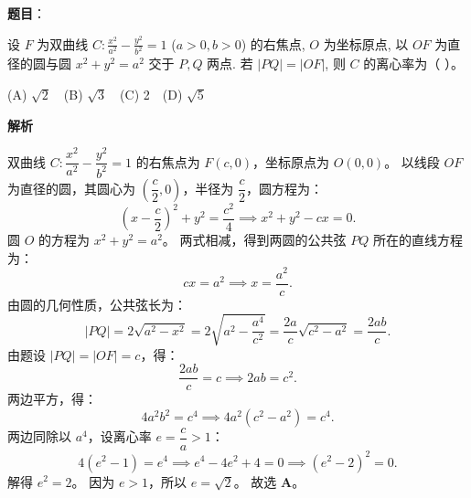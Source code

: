 \begin{answer}

\textbf{题目}：

设 $F$ 为双曲线 $C: \frac{x^2}{a^2} - \frac{y^2}{b^2} = 1$ ($a > 0, b > 0$) 的右焦点, $O$ 为坐标原点, 以 $OF$ 为直径的圆与圆 $x^2 + y^2 = a^2$ 交于 $P, Q$ 两点. 若 $|PQ| = |OF|$, 则 $C$ 的离心率为（ ）。

(A) $\sqrt{2}$　(B) $\sqrt{3}$　(C) 2　(D) $\sqrt{5}$

\textbf{解析}

双曲线 $C: \dfrac{x^2}{a^2} - \dfrac{y^2}{b^2} = 1$ 的右焦点为 $F(c, 0)$，坐标原点为 $O(0, 0)$。
以线段 $OF$ 为直径的圆，其圆心为 $(\dfrac{c}{2}, 0)$，半径为 $\dfrac{c}{2}$，圆方程为：
\nopagebreak[4]
\[\left(x - \frac{c}{2}\right)^2 + y^2 = \frac{c^2}{4} \implies x^2 + y^2 - cx = 0.\]
圆 $O$ 的方程为 $x^2 + y^2 = a^2$。
两式相减，得到两圆的公共弦 $PQ$ 所在的直线方程为：
\nopagebreak[4]
\[cx = a^2 \implies x = \frac{a^2}{c}.\]
由圆的几何性质，公共弦长为：
\nopagebreak[4]
\[|PQ| = 2\sqrt{a^2 - x^2} = 2\sqrt{a^2 - \frac{a^4}{c^2}} = \frac{2a}{c}\sqrt{c^2 - a^2} = \frac{2ab}{c}.\]
由题设 $|PQ| = |OF| = c$，得：
\nopagebreak[4]
\[\frac{2ab}{c} = c \implies 2ab = c^2.\]
两边平方，得：
\nopagebreak[4]
\[4a^2 b^2 = c^4 \implies 4a^2(c^2 - a^2) = c^4.\]
两边同除以 $a^4$，设离心率 $e = \dfrac{c}{a} > 1$：
\nopagebreak[4]
\[4(e^2 - 1) = e^4 \implies e^4 - 4e^2 + 4 = 0 \implies (e^2 - 2)^2 = 0.\]
解得 $e^2 = 2$。
因为 $e > 1$，所以 $e = \sqrt{2}$。
故选 \textbf{A}。


\par\medskip

\end{answer}

